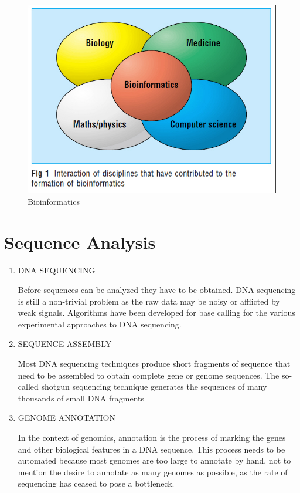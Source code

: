 \begin{figure}[ht]
\centering
\includegraphics[scale=0.5]{images/bio.png}
\caption{Bioinformatics}
\end{figure}


\section{Sequence Analysis}
\begin{enumerate}
\item DNA SEQUENCING


Before sequences can be analyzed they have to be obtained. DNA sequencing is still a non-trivial problem as the raw data may be noisy or afflicted by weak signals. Algorithms have been developed for base calling for the various experimental approaches to DNA sequencing.
\item SEQUENCE ASSEMBLY


Most DNA sequencing techniques produce short fragments of sequence that need to be assembled to obtain complete gene or genome sequences. The so-called shotgun sequencing technique generates the sequences of many thousands of small DNA fragments
\item GENOME ANNOTATION


In the context of genomics, annotation is the process of marking the genes and other biological features in a DNA sequence. This process needs to be automated because most genomes are too large to annotate by hand, not to mention the desire to annotate as many genomes as possible, as the rate of sequencing has ceased to pose a bottleneck.
\end{enumerate}
